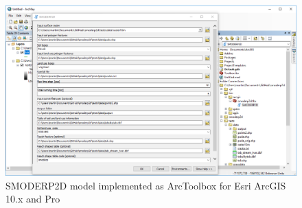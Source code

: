 \begin{figure}[ht!]
  \begin{center}
    \includegraphics[width=1.0\columnwidth]{figures/smoderp2d_arcgis.png}
    \caption{SMODERP2D model implemented as ArcToolbox for Esri ArcGIS
      10.x and Pro}
    \label{fig:uml_diagram}
  \end{center}
\end{figure}
